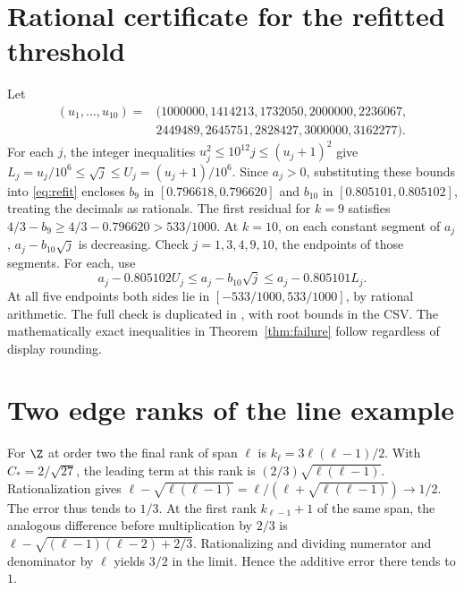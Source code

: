 \documentclass[11pt,a4paper]{article}
\theoremstyle{definition}
\begin{document}
\section{Rational certificate for the refitted threshold}\label{app:certificate}

Let
\[
\begin{aligned}
(u_1,\ldots,u_{10})={}&(1000000,1414213,1732050,2000000,2236067,\\
&2449489,2645751,2828427,3000000,3162277).
\end{aligned}
\]
For each \(j\), the integer inequalities \(u_j^2\le10^{12}j\le(u_j+1)^2\) give \(L_j=u_j/10^6\le\sqrt j\le U_j=(u_j+1)/10^6\). Since \(a_j>0\), substituting these bounds into \eqref{eq:refit} encloses \(b_9\) in \([0.796618,0.796620]\) and \(b_{10}\) in \([0.805101,0.805102]\), treating the decimals as rationals. The first residual for \(k=9\) satisfies \(4/3-b_9\ge 4/3-0.796620>533/1000\). At \(k=10\), on each constant segment of \(a_j\), \(a_j-b_{10}\sqrt{j}\) is decreasing. Check \(j=1,3,4,9,10\), the endpoints of those segments. For each, use
\[
a_j-0.805102 U_j\le a_j-b_{10}\sqrt j\le a_j-0.805101 L_j.
\]
At all five endpoints both sides lie in \([-533/1000,533/1000]\), by rational arithmetic. The full check is duplicated in , with root bounds in the CSV. The mathematically exact inequalities in Theorem~\ref{thm:failure} follow regardless of display rounding.

\section{Two edge ranks of the line example}\label{app:line}

For \(\Z\) at order two the final rank of span \(\ell\) is \(k_\ell=3\ell(\ell-1)/2\). With \(C_*=2/\sqrt{27}\), the leading term at this rank is \((2/3)\sqrt{\ell(\ell-1)}\). Rationalization gives \(\ell-\sqrt{\ell(\ell-1)}=\ell/(\ell+\sqrt{\ell(\ell-1)})\to1/2\). The error thus tends to \(1/3\). At the first rank \(k_{\ell-1}+1\) of the same span, the analogous difference before multiplication by \(2/3\) is \(\ell-\sqrt{(\ell-1)(\ell-2)+2/3}\). Rationalizing and dividing numerator and denominator by \(\ell\) yields \(3/2\) in the limit. Hence the additive error there tends to \(1\).



\end{document}
